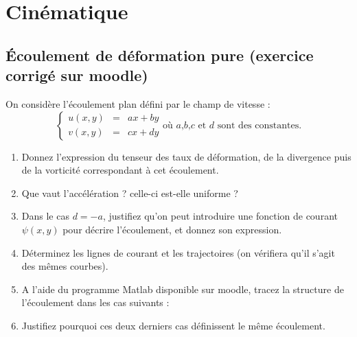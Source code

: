 
\setcounter{section}{2}
\section{Cinématique}

\setcounter{subsection}{-1}

\subsection{\'Ecoulement de d\'eformation pure (exercice corrigé sur moodle)}


On consid\`ere l'\'ecoulement plan
d\'efini par le champ de vitesse : 
\begin{equation*}
\left\{
\begin{array}{ccr}
u(x,y) & = & a x +b y \\ 
v(x,y) & = & cx + dy
\end{array}
\right.
\text{o\`u $a$,$b$,$c$  et $d$ sont des constantes.}
\end{equation*}
\begin{enumerate}


\item Donnez l'expression du tenseur des taux de déformation, de la divergence puis de la vorticité correspondant à cet écoulement.

\item Que vaut l'accélération ? celle-ci est-elle uniforme ?

\item Dans le cas $d=-a$, justifiez qu'on peut introduire une fonction de courant $\psi(x,y)$ pour décrire l'écoulement, et donnez son expression.

\item Déterminez les lignes de courant et les trajectoires (on vérifiera qu'il s'agit des mêmes courbes).

\item A l'aide du programme Matlab disponible sur moodle, tracez la structure de l'écoulement dans les cas suivants :

\item Justifiez pourquoi ces deux derniers cas définissent le même écoulement.

\end{enumerate}




